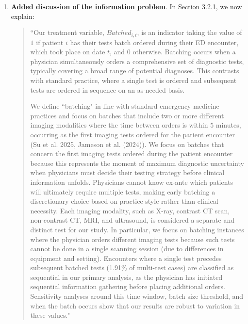 \documentclass[11pt]{article}
\newcommand{\1}{\hbox{\rm 1\kern-.35em 1}}
\begin{document}
{{\begin{enumerate}
    \item \textbf{Added discussion of the information problem}. In Section 3.2.1, we now explain: 
    \begin{quote}
    ``Our treatment variable, $Batched_{i,t}$, is an indicator taking the value of $1$ if patient $i$ has their tests batch ordered during their ED encounter, which took place on date $t$, and $0$ otherwise. Batching occurs when a physician simultaneously orders a comprehensive set of diagnostic tests, typically covering a broad range of potential diagnoses. This contrasts with standard practice, where a single test is ordered and subsequent tests are ordered in sequence on an as-needed basis.
    
    We define ``batching" in line with standard emergency medicine practices and focus on batches that include two or more different imaging modalities where the time between orders is within 5 minutes, occurring as the first imaging tests ordered for the patient encounter (Su et al. 2025, Jameson et al. (2024)). We focus on batches that concern the first imaging tests ordered during the patient encounter because this represents the moment of maximum diagnostic uncertainty when physicians must decide their testing strategy before clinical information unfolds. Physicians cannot know ex-ante which patients will ultimately require multiple tests, making early batching a discretionary choice based on practice style rather than clinical necessity. Each imaging modality, such as X-ray, contrast CT scan, non-contrast CT, MRI, and ultrasound, is considered a separate and distinct test for our study. In particular, we focus on batching instances where the physician orders different imaging tests because such tests cannot be done in a single scanning session (due to differences in equipment and setting). Encounters where a single test precedes subsequent batched tests (1.91\% of multi-test cases) are classified as sequential in our primary analysis, as the physician has initiated sequential information gathering before placing additional orders. Sensitivity analyses around this time window, batch size threshold, and when the batch occurs show that our results are robust to variation in these values."
    \end{quote}



\end{enumerate}}}
\end{document}
